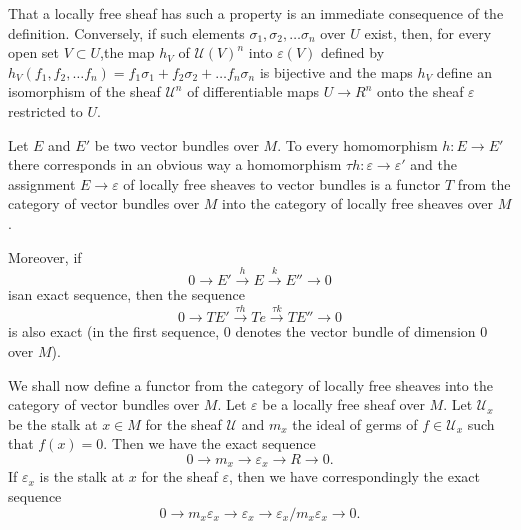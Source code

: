 That a locally free sheaf has such a property is an immediate
consequence of the definition. Conversely, if such elements $\sigma_1,
\sigma_2, \ldots \sigma_n$ over $U$ exist, then, for every open set $V
\subset U$,the map $h_V$ of $\mathscr{U}(V)^n$ into $\varepsilon (V)$
defined by $h_V(f_1, f_2, \ldots f_n)= f_1 \sigma_1 + f_2 \sigma_2 +
\ldots f_n \sigma_n$ is bijective and the maps $h_V$ define an
isomorphism of the sheaf $\mathscr{U}^n$ of differentiable maps $U \to
R^n$ onto the sheaf $\varepsilon$ restricted to $U$. 

Let $E$ and $E'$ be two vector bundles over $M$. To every homomorphism
$h: E \to E'$ there corresponds in an obvious way a homomorphism $\tau
h : \varepsilon \to \varepsilon'$ and the assignment $E \to
\varepsilon$ of locally free sheaves to vector bundles is a functor
$T$ from the category of vector bundles over $M$ into the category of
locally free sheaves over $M$. 

Moreover, if 
$$
0 \to  E' \xrightarrow{h} E \xrightarrow{k} E'' \to 0
$$
is\pageoriginale an exact sequence, then the sequence 
$$
0 \to TE' \xrightarrow{ \tau h} Te \xrightarrow{ \tau k} TE'' \to 0
$$
is also exact (in the first sequence, 0 denotes the vector bundle of
dimension 0 over $M$). 

We shall now define a functor from the category of locally free
sheaves into the category of vector bundles over $M$. Let
$\varepsilon$ be a locally free sheaf over $M$. Let $\mathscr{U}_x$ be
the stalk at $x \in M$ for the sheaf $\mathscr{U}$ and $m_x$ the ideal
of germs of $f \in \mathscr{U}_x$ such that $f(x) =0$. Then we have
the exact sequence  
$$
0 \to m_x \to \varepsilon_x \to R \to 0.
$$
If $\varepsilon_x$ is the stalk at $x$ for the sheaf $\varepsilon$,
then we have correspondingly the exact sequence  
$$
0 \to m_x \varepsilon_x \to \varepsilon_x \to \varepsilon_x / m_x
\varepsilon_x \to 0. 
$$

